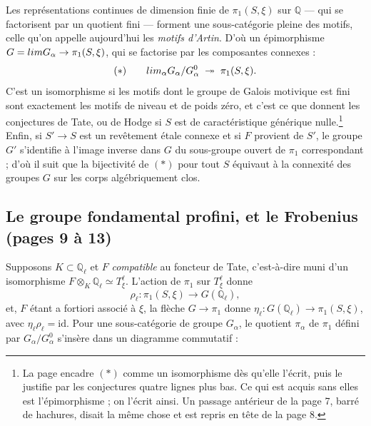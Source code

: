 \documentclass[11pt,a4paper]{article}
\begin{document}
Les représentations continues de dimension finie de $\pi_{1}(S, \xi)$ sur
$\mathbb{Q}$ --- qui se factorisent par un quotient fini --- forment une
sous-catégorie pleine des motifs, celle qu'on appelle aujourd'hui les
\emph{motifs d'Artin}. D'où un épimorphisme $G = \varprojlim G_{\alpha} \to
\pi_{1}(S, \xi)$, qui se factorise par les composantes connexes :
\[
(*) \qquad \varprojlim_{\alpha} G_{\alpha}/G_{\alpha}^{0}
\;\twoheadrightarrow\; \pi_{1}(S, \xi) .
\]
C'est un isomorphisme si les motifs dont le groupe de Galois motivique est
fini sont exactement les motifs de niveau et de poids zéro, et c'est ce que
donnent les conjectures de Tate, ou de Hodge si $S$ est de caractéristique
générique nulle.\footnote{La page encadre $(*)$ comme un isomorphisme dès qu'elle
l'écrit, puis le justifie par les conjectures quatre lignes plus bas. Ce qui
est acquis sans elles est l'épimorphisme ; on l'écrit ainsi. Un passage
antérieur de la page 7, barré de hachures, disait la même chose et est repris
en tête de la page 8.} Enfin, si $S' \to S$ est un revêtement étale connexe et
si $F$ provient de $S'$, le groupe $G'$ s'identifie à l'image inverse dans $G$
du sous-groupe ouvert de $\pi_{1}$ correspondant ; d'où il suit que la
bijectivité de $(*)$ pour tout $S$ équivaut à la connexité des groupes $G$ sur
les corps algébriquement clos.

\subsection*{Le groupe fondamental profini, et le Frobenius (pages 9 à 13)}

Supposons $K \subset \mathbb{Q}_{\ell}$ et $F$ \emph{compatible} au foncteur de
Tate, c'est-à-dire muni d'un isomorphisme $F \otimes_{K} \mathbb{Q}_{\ell}
\simeq T^{\ell}_{\xi}$. L'action de $\pi_{1}$ sur $T^{\ell}_{\xi}$ donne
\[
\rho_{\ell} \colon \pi_{1}(S, \xi) \longrightarrow G(\mathbb{Q}_{\ell}) ,
\]
et, $F$ étant a fortiori associé à $\xi$, la flèche $G \to \pi_{1}$ donne
$\eta_{\ell} \colon G(\mathbb{Q}_{\ell}) \to \pi_{1}(S, \xi)$, avec
$\eta_{\ell}\rho_{\ell} = \mathrm{id}$. Pour une sous-catégorie de groupe
$G_{\alpha}$, le quotient $\pi_{\alpha}$ de $\pi_{1}$ défini par
$G_{\alpha}/G_{\alpha}^{0}$ s'insère dans un diagramme commutatif :

\end{document}
